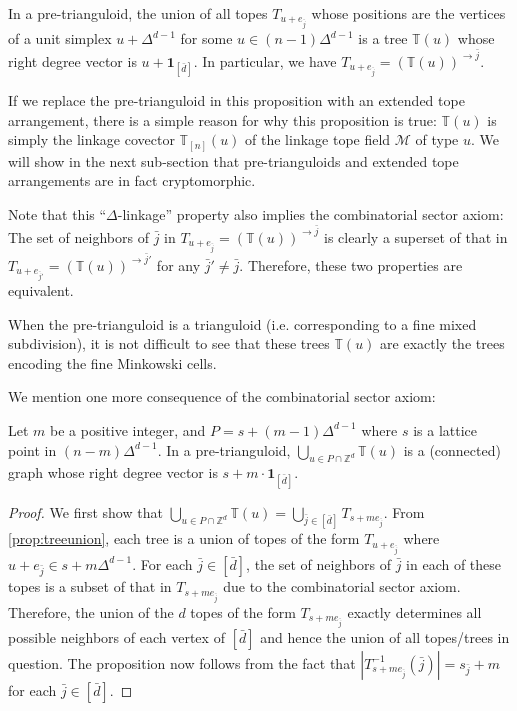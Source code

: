 \documentclass[letterpaper,reqno,11pt]{amsart}
\begin{document}
\begin{proposition}\label{prop:treeunion}
    In a pre-trianguloid, the union of all topes $T_{u + e_{\bar{j}}}$ whose positions are the vertices of a unit simplex $u + \Delta^{d-1}$ for some $u\in (n-1)\Delta^{d-1}$ is a tree $\mathbb{T}(u)$ whose right degree vector is $u + \mathbf{1}_{[\bar{d}]}$. In particular, we have $T_{u + e_{\bar{j}}} = (\mathbb{T}(u))^{\rightarrow \bar{j}}$.
\end{proposition}

\begin{remark}
    If we replace the pre-trianguloid in this proposition with an extended tope arrangement, there is a simple reason for why this proposition is true: $\mathbb{T}(u)$ is simply the linkage covector $\mathbb{T}_{[n]}(u)$ of the linkage tope field $\mathcal{M}$ of type $u$. We will show in the next sub-section that pre-trianguloids and extended tope arrangements are in fact cryptomorphic.
\end{remark}

\begin{remark}
    Note that this ``$\Delta$-linkage'' property also implies the combinatorial sector axiom: The set of neighbors of $\bar{j}$ in $T_{u + e_{\bar{j}}} = (\mathbb{T}(u))^{\rightarrow \bar{j}}$ is clearly a superset of that in $T_{u + e_{\bar{j}'}} = (\mathbb{T}(u))^{\rightarrow \bar{j}'}$ for any $\bar{j}'\neq \bar{j}$. Therefore, these two properties are equivalent.
\end{remark}

When the pre-trianguloid is a trianguloid (i.e. corresponding to a fine mixed subdivision), it is not difficult to see that these trees $\mathbb{T}(u)$ are exactly the trees encoding the fine Minkowski cells.

We mention one more consequence of the combinatorial sector axiom:

\begin{proposition}\label{prop:largetreeunion}
    Let $m$ be a positive integer, and $P = s + (m-1)\Delta^{d-1}$ where $s$ is a lattice point in $(n-m)\Delta^{d-1}$. In a pre-trianguloid, $\bigcup_{u\in P\cap \mathbb{Z}^{d}} \mathbb{T}(u)$ is a (connected) graph whose right degree vector is $s + m\cdot \mathbf{1}_{[\bar{d}]}$.
\end{proposition}

\begin{proof}
    We first show that $\bigcup_{u\in P\cap \mathbb{Z}^{d}} \mathbb{T}(u) = \bigcup_{\bar{j}\in[\bar{d}]} T_{s + me_{\bar{j}}}$. From \cref{prop:treeunion}, each tree is a union of topes of the form $T_{u + e_{\bar{j}}}$ where $u+e_{\bar{j}}\in s + m\Delta^{d-1}$. For each $\bar{j}\in[\bar{d}]$, the set of neighbors of $\bar{j}$ in each of these topes is a subset of that in $T_{s + me_{\bar{j}}}$ due to the combinatorial sector axiom. Therefore, the union of the $d$ topes of the form $T_{s + me_{\bar{j}}}$ exactly determines all possible neighbors of each vertex of $[\bar{d}]$ and hence the union of all topes/trees in question. The proposition now follows from the fact that $|T^{-1}_{s+me_{\bar{j}}}(\bar{j})| = s_{\bar{j}} + m$ for each $\bar{j}\in [\bar{d}]$.
\end{proof}
\end{document}
